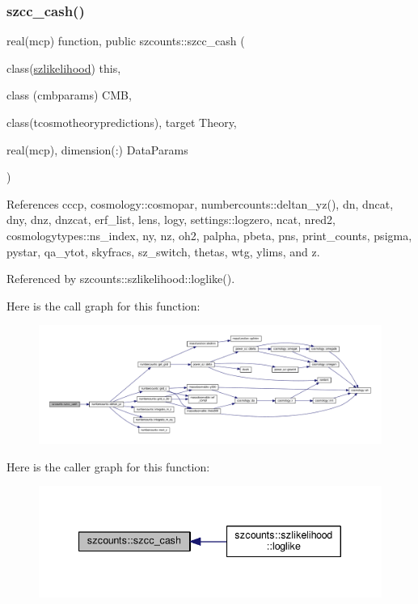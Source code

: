\subsubsection{\texorpdfstring{szcc\+\_\+cash()}{szcc\_cash()}}
{\footnotesize\ttfamily real(mcp) function, public szcounts\+::szcc\+\_\+cash (\begin{DoxyParamCaption}\item[{class(\mbox{\hyperlink{structszcounts_1_1szlikelihood}{szlikelihood}})}]{this,  }\item[{class (cmbparams)}]{C\+MB,  }\item[{class(tcosmotheorypredictions), target}]{Theory,  }\item[{real(mcp), dimension(\+:)}]{Data\+Params }\end{DoxyParamCaption})}



References cccp, cosmology\+::cosmopar, numbercounts\+::deltan\+\_\+yz(), dn, dncat, dny, dnz, dnzcat, erf\+\_\+list, lens, logy, settings\+::logzero, ncat, nred2, cosmologytypes\+::ns\+\_\+index, ny, nz, oh2, palpha, pbeta, pns, print\+\_\+counts, psigma, pystar, qa\+\_\+ytot, skyfracs, sz\+\_\+switch, thetas, wtg, ylims, and z.



Referenced by szcounts\+::szlikelihood\+::loglike().

Here is the call graph for this function\+:
\nopagebreak
\begin{figure}[H]
\begin{center}
\leavevmode
\includegraphics[width=350pt]{namespaceszcounts_abc28ab0b8d2db0b6f91aa9b99cac694f_cgraph}
\end{center}
\end{figure}
Here is the caller graph for this function\+:
\nopagebreak
\begin{figure}[H]
\begin{center}
\leavevmode
\includegraphics[width=340pt]{namespaceszcounts_abc28ab0b8d2db0b6f91aa9b99cac694f_icgraph}
\end{center}
\end{figure}
\mbox{\label{namespaceszcounts_a0c8563799b2d0ed9c6c98a8164fa46b9}} 

